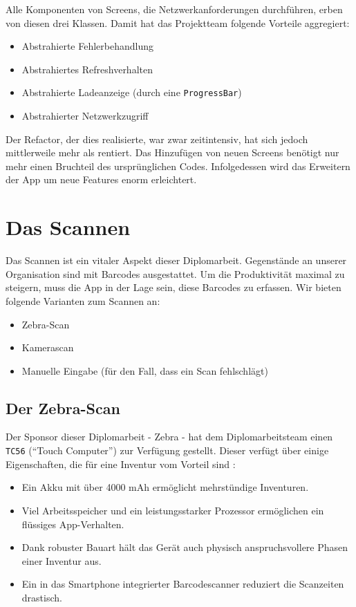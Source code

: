 Alle Komponenten von Screens, die Netzwerkanforderungen durchführen,
erben von diesen drei Klassen. Damit hat das Projektteam folgende
Vorteile aggregiert:

\begin{itemize}
\tightlist
\item
  Abstrahierte Fehlerbehandlung
\item
  Abstrahiertes Refreshverhalten
\item
  Abstrahierte Ladeanzeige (durch eine \texttt{ProgressBar})
\item
  Abstrahierter Netzwerkzugriff
\end{itemize}

Der Refactor, der dies realisierte, war zwar zeitintensiv, hat sich
jedoch mittlerweile mehr als rentiert. Das Hinzufügen von neuen Screens
benötigt nur mehr einen Bruchteil des ursprünglichen Codes.
Infolgedessen wird das Erweitern der App um neue Features enorm
erleichtert.

\chapter{Das Scannen}
\label{das_scannen}

Das Scannen ist ein vitaler Aspekt dieser Diplomarbeit. Gegenstände an
unserer Organisation sind mit Barcodes ausgestattet. Um die
Produktivität maximal zu steigern, muss die App in der Lage sein, diese
Barcodes zu erfassen. Wir bieten folgende Varianten zum Scannen an:

\begin{itemize}
\tightlist
\item
  Zebra-Scan
\item
  Kamerascan
\item
  Manuelle Eingabe (für den Fall, dass ein Scan fehlschlägt)
\end{itemize}

\hypertarget{der-zebra-scan}{%
\section{Der Zebra-Scan}\label{der-zebra-scan}}

Der Sponsor dieser Diplomarbeit - Zebra - hat dem Diplomarbeitsteam
einen \texttt{TC56} (``Touch Computer'') zur Verfügung gestellt. Dieser
verfügt über einige Eigenschaften, die für eine Inventur vom Vorteil
sind \cite{zebra-tc56}:

\begin{itemize}
\tightlist
\item
  Ein Akku mit über 4000 mAh ermöglicht mehrstündige Inventuren.
\item
  Viel Arbeitsspeicher und ein leistungsstarker Prozessor ermöglichen
  ein flüssiges App-Verhalten.
\item
  Dank robuster Bauart hält das Gerät auch physisch anspruchsvollere
  Phasen einer Inventur aus.
\item
  Ein in das Smartphone integrierter Barcodescanner reduziert die
  Scanzeiten drastisch.
\end{itemize}

